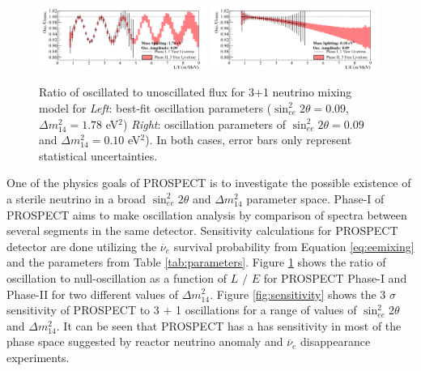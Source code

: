 \documentclass[11pt]{article}
\newcommand{\nuebar}{\ensuremath{\overline{\nu }_{e}} \hspace{1pt}}
\numberwithin{equation}{section}
\begin{document}
\begin{figure}[h]
\centering
\includegraphics*[trim=0.1cm 0.1cm 0.1cm 0.1cm, clip=true, width=0.49\textwidth]{./LoverE.png}
\includegraphics*[trim=0.1cm 0.1cm 0.1cm 0.1cm, clip=true, width=0.49\textwidth]{./LoverE-2.png}
\caption[Ratio of oscillated to unoscillated flux as a function of $L/E$]{Ratio of oscillated to unoscillated flux for 3+1 neutrino mixing model for \textit{Left}: best-fit oscillation parameters ($\sin ^2_{ee}{2 \theta} =0.09$, $\Delta m^{2}_{14}=1.78 $ eV$^{2}$) \textit{Right}: oscillation parameters of $\sin ^2_{ee}{2 \theta}=0.09$ and $\Delta m^{2}_{14}=0.10 $ eV$^{2}$). In both cases, error bars only represent statistical uncertainties.}
\label{fig:LoverE}
\end{figure}

One of the physics goals of PROSPECT is to investigate the possible existence of a sterile neutrino in a broad $\sin ^2_{ee}{2 \theta}$ and $\Delta m^{2}_{14}$ parameter space. Phase-I of PROSPECT aims to make oscillation analysis by comparison of spectra between several segments in the same detector. Sensitivity calculations for PROSPECT detector are done utilizing the \nuebar survival probability from Equation \ref{eq:eemixing} and the parameters from Table \ref{tab:parameters}. Figure \ref{fig:LoverE} shows the ratio of oscillation to null-oscillation as a function of $L$ $/$ $E$ for PROSPECT Phase-I and Phase-II for two different values of $\Delta m^{2}_{14}$. Figure \ref{fig:sensitivity} shows the 3 $\sigma$ sensitivity of PROSPECT to 3 + 1 oscillations for a range of  values of $\sin ^2_{ee}{2\theta}$ and $\Delta m^{2}_{14}$. It can be seen that PROSPECT has a has sensitivity in most of the phase space suggested by reactor neutrino anomaly and \nuebar disappearance experiments.
\end{document}

